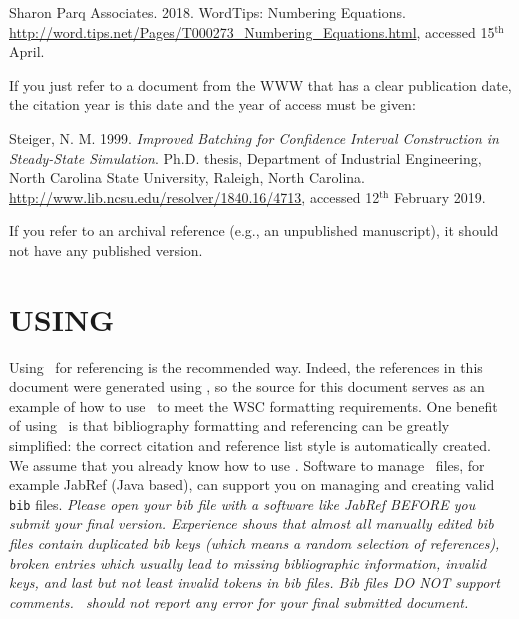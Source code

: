 \documentclass{wscpaperproc}
\theoremstyle{wsc}
\begin{document}
{\sloppy
{\footnotesize
\begin{hangref}
\item Sharon Parq Associates. 2018. WordTips: Numbering Equations. \href{http://word.tips.net/Pages/T000273_Numbering_Equations.html}{http://word.tips.net/Pages/T000273\_Numbering\_Equations.html}, accessed 15$^{\textrm{th}}$ April.
\end{hangref}
}
}

If you just refer to a document from the WWW that has a clear publication date, the citation year is this date and the year of access must be given: 

{\sloppy
{\footnotesize
\begin{hangref}
\item Steiger, N. M. 1999. \textit{Improved Batching for Confidence Interval Construction in Steady-State Simulation}. Ph.D. thesis, Department of Industrial Engineering, North Carolina State University, Raleigh, North Carolina. \href{http://www.lib.ncsu.edu/resolver/1840.16/4713}{http://www.lib.ncsu.edu/resolver/1840.16/4713}, accessed 12$^{\textrm{th}}$ February 2019.
\end{hangref}
}
}

If you refer to an archival reference (e.g., an unpublished manuscript), it should not have any published version.

\section{USING \texorpdfstring{\BibTeX}{BibTex}}
\label{sec:bibtex}
Using \BibTeX\ for referencing is the recommended way. Indeed, the references in this document were generated using \BibTeX, so the source for this
document serves as an example of how to use \BibTeX\ to meet the WSC formatting requirements.
One benefit of using \BibTeX\ is that bibliography formatting and referencing can be greatly simplified: the correct citation and reference list style is automatically created.
We assume that you already know how to use \BibTeX.
Software to manage \BibTeX\ files, for example JabRef (Java based), can support you on managing and creating valid {\tt bib} files.
{\em Please open your bib file with a software like JabRef BEFORE you submit your final version. Experience shows that almost all manually edited bib files contain duplicated bib keys (which means a random selection of references), broken entries which usually lead to missing bibliographic information, invalid keys, and last but not least invalid tokens in bib files. Bib files DO NOT support comments. \BibTeX\ should not report any error for your final submitted document.}
\end{document}
